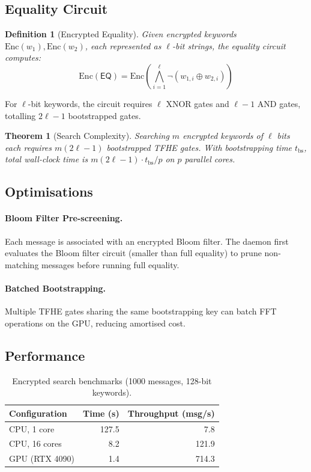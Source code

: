 \documentclass[11pt,a4paper]{article}
\newtheorem{definition}{Definition}[section]
\newtheorem{theorem}{Theorem}[section]
\begin{document}
\subsection{Equality Circuit}

\begin{definition}[Encrypted Equality]
    Given encrypted keywords $\mathrm{Enc}(w_1), \mathrm{Enc}(w_2)$,
    each represented as $\ell$-bit strings, the equality circuit computes:
    \[
        \mathrm{Enc}(\mathsf{EQ}) = \mathrm{Enc}\!\left(
        \bigwedge_{i=1}^{\ell} \neg(w_{1,i} \oplus w_{2,i})
        \right)
    \]
\end{definition}

For $\ell$-bit keywords, the circuit requires $\ell$ XNOR gates and
$\ell - 1$ AND gates, totalling $2\ell - 1$ bootstrapped gates.

\begin{theorem}[Search Complexity]
    Searching $m$ encrypted keywords of $\ell$ bits each requires
    $m(2\ell - 1)$ bootstrapped TFHE gates.  With bootstrapping time
    $t_{\mathrm{bs}}$, total wall-clock time is
    $m(2\ell - 1) \cdot t_{\mathrm{bs}} / p$ on $p$ parallel cores.
\end{theorem}

\subsection{Optimisations}

\paragraph{Bloom Filter Pre-screening.}
Each message is associated with an encrypted Bloom filter.  The daemon
first evaluates the Bloom filter circuit (smaller than full equality) to
prune non-matching messages before running full equality.

\paragraph{Batched Bootstrapping.}
Multiple TFHE gates sharing the same bootstrapping key can batch FFT
operations on the GPU, reducing amortised cost.

\subsection{Performance}

\begin{table}[h]
\centering
\caption{Encrypted search benchmarks (1000 messages, 128-bit keywords).}
\label{tab:search_bench}
\begin{tabular}{@{}lrr@{}}
\toprule
\textbf{Configuration} & \textbf{Time (s)} & \textbf{Throughput (msg/s)} \\
\midrule
CPU, 1 core     & 127.5 & 7.8 \\
CPU, 16 cores   & 8.2   & 121.9 \\
GPU (RTX 4090)  & 1.4   & 714.3 \\
\bottomrule
\end{tabular}
\end{table}
\end{document}
